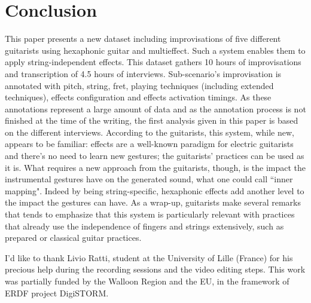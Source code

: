 \documentclass{article}
\begin{document}
\section{Conclusion}\label{sec:conclusion}
This paper presents a new dataset including improvisations of five different guitarists using hexaphonic guitar and multieffect. Such a system enables them to apply string-inde\-pendent effects. This dataset gathers 10 hours of improvisations and transcription of 4.5 hours of interviews. 
Sub-scenario's improvisation is annotated with pitch, string, fret, playing techniques (including extended techniques), effects configuration and effects activation timings. As these annotations represent a large amount of data and as the annotation process is not finished at the time of the writing, the first analysis given in this paper is based on the different interviews. According to the guitarists, this system, while new, appears to be familiar: effects are a well-known paradigm for electric guitarists and there's no need to learn new gestures; the guitarists' practices can be used as it is. What requires a new approach from the guitarists, though, is the impact the instrumental gestures have on the generated sound, what one could call ``inner mapping".  Indeed by being string-specific, hexaphonic effects add another level to the impact the gestures can have.
As a wrap-up, guitarists make several remarks that tends to emphasize that this system is particularly relevant with practices that already use the independence of fingers and strings extensively, such as prepared or classical guitar practices.



\begin{acknowledgments}
I'd like to thank Livio Ratti, student at the University of Lille (France) for his precious help during the recording sessions and the video editing steps. 
This work was partially funded by the Walloon Region and the EU, in the framework of ERDF project DigiSTORM.
\end{acknowledgments} 


\end{document}
